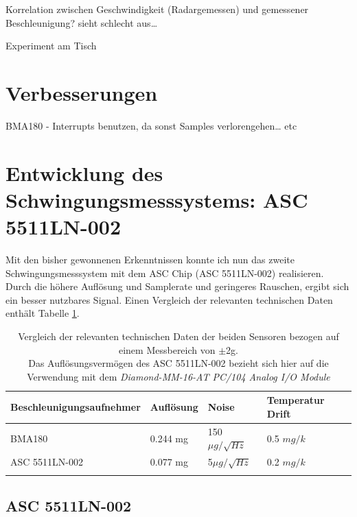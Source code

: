 \documentclass[12pt,a4paper]{scrartcl}
\begin{document}
Korrelation zwischen Geschwindigkeit (Radargemessen) und gemessener Beschleunigung? 
sieht schlecht aus…

Experiment am Tisch


\section{Verbesserungen}

BMA180 - Interrupts benutzen, da sonst Samples verlorengehen… etc



\newpage
\section{Entwicklung des Schwingungsmesssystems: ASC 5511LN-002}


Mit den bisher gewonnenen Erkenntnissen konnte ich nun das zweite Schwingungsmesssystem mit dem ASC Chip (ASC 5511LN-002) realisieren. Durch die höhere Auflösung und Samplerate und geringeres Rauschen, ergibt sich ein besser nutzbares Signal. Einen Vergleich der relevanten technischen Daten enthält Tabelle \ref{sensorcompare}.

\begin{table}[ht]
\begin{tabular}{@{}llll@{}}    
      			\cmidrule(r){1-4}\morecmidrules\cmidrule(r){1-4}
       			Beschleunigungsaufnehmer & Auflösung & Noise & Temperatur Drift\\
      			\midrule
 			BMA180 				   & 0.244 mg  & 150$\mu g / \sqrt{Hz}$ & 0.5 $mg/k$ \\ 
 			ASC 5511LN-002 		   & 0.077 mg  &    5$\mu g / \sqrt{Hz}$  & 0.2 $mg/k$\\
 		
   			\addlinespace
   			\bottomrule
 \end{tabular}
 \caption{Vergleich der relevanten technischen Daten der beiden Sensoren bezogen auf einem Messbereich von $\pm$2g.\\ Das Auflösungsvermögen des ASC 5511LN-002 bezieht sich hier auf die Verwendung mit  dem \textit{Diamond-MM-16-AT PC/104 Analog I/O Module}}
 \label{sensorcompare}
\end{table}

\subsection{ASC 5511LN-002}
\end{document}
